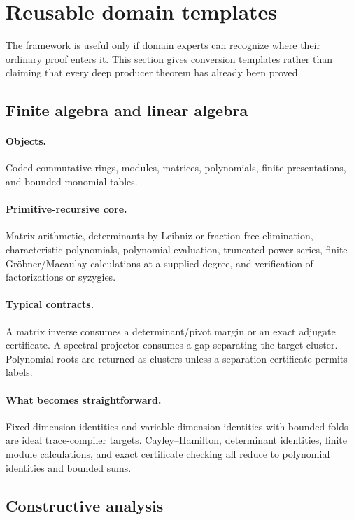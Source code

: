 \section{Reusable domain templates}
\label{sec:domains}

The framework is useful only if domain experts can recognize where their
ordinary proof enters it.  This section gives conversion templates rather than
claiming that every deep producer theorem has already been proved.

\subsection{Finite algebra and linear algebra}

\paragraph{Objects.}
Coded commutative rings, modules, matrices, polynomials, finite presentations,
and bounded monomial tables.

\paragraph{Primitive-recursive core.}
Matrix arithmetic, determinants by Leibniz or fraction-free elimination,
characteristic polynomials, polynomial evaluation, truncated power series,
finite Gröbner/Macaulay calculations at a supplied degree, and verification of
factorizations or syzygies.

\paragraph{Typical contracts.}
A matrix inverse consumes a determinant/pivot margin or an exact adjugate
certificate.  A spectral projector consumes a gap separating the target
cluster.  Polynomial roots are returned as clusters unless a separation
certificate permits labels.

\paragraph{What becomes straightforward.}
Fixed-dimension identities and variable-dimension identities with bounded
folds are ideal trace-compiler targets.  Cayley--Hamilton, determinant
identities, finite module calculations, and exact certificate checking all
reduce to polynomial identities and bounded sums.

\subsection{Constructive analysis}

